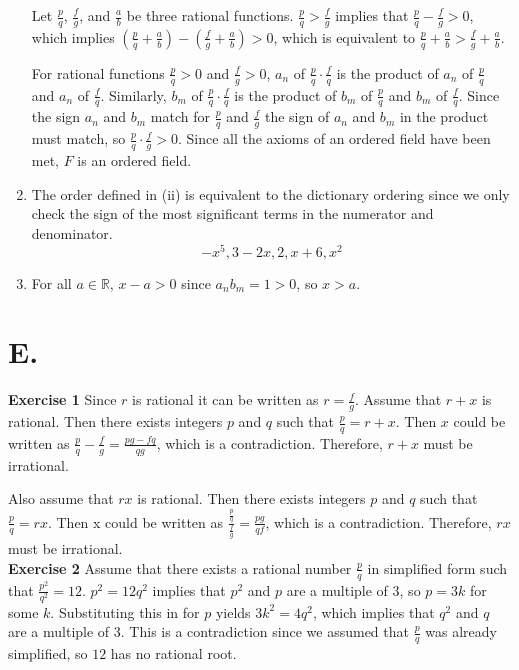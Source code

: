 \documentclass{article}
\begin{document}
\begin{enumerate}
    Let $\frac{p}{q}$, $\frac{f}{g}$, and $\frac{a}{b}$ be three rational functions.
    $\frac{p}{q} > \frac{f}{g}$ implies that $\frac{p}{q} - \frac{f}{g} > 0$, which implies
    $(\frac{p}{q} + \frac{a}{b}) - (\frac{f}{g} + \frac{a}{b}) > 0$, which is equivalent to
    $\frac{p}{q} + \frac{a}{b} > \frac{f}{g} + \frac{a}{b}$.

    For rational functions $\frac{p}{q} > 0$ and $\frac{f}{g} > 0$,
    $a_n$ of $\frac{p}{q}\cdot\frac{f}{q}$ is the product of $a_n$ of $\frac{p}{q}$
    and $a_n$ of $\frac{f}{q}$.
    Similarly, $b_m$ of $\frac{p}{q}\cdot\frac{f}{q}$ is the product of $b_m$ of $\frac{p}{q}$
    and $b_m$ of $\frac{f}{q}$.
    Since the sign $a_n$ and $b_m$ match for $\frac{p}{q}$ and $\frac{f}{g}$
    the sign of $a_n$ and $b_m$ in the product must match, 
    so $\frac{p}{q} \cdot \frac{f}{g} > 0$.
    Since all the axioms of an ordered field have been met, $F$ is an ordered field.
    \item The order defined in (ii) is equivalent to the dictionary ordering since 
    we only check the sign of the most significant terms in the numerator and denominator.
    \[
        -x^5, 3-2x, 2, x+6, x^2
    \]
    \item For all $a \in \mathbb{R}$, $x-a > 0$ since $a_nb_m = 1 > 0$, so $x > a$.
\end{enumerate}
\newpage

\section*{E.}
    \textbf{Exercise 1}
    Since $r$ is rational it can be written as $r = \frac{f}{g}$.
    Assume that $r+x$ is rational. 
    Then there exists integers $p$ and $q$ such that $\frac{p}{q} = r+x$.
    Then $x$ could be written as $\frac{p}{q} - \frac{f}{g} = \frac{pg-fq}{qg}$,
    which is a contradiction.
    Therefore, $r+x$ must be irrational.

    Also assume that $rx$ is rational.
    Then there exists integers $p$ and $q$ such that $\frac{p}{q} = rx$.
    Then x could be written as $\frac{\frac{p}{q}}{\frac{f}{g}} = \frac{pg}{qf}$,
    which is a contradiction.
    Therefore, $rx$ must be irrational.\\

    \textbf{Exercise 2}
    Assume that there exists a rational number $\frac{p}{q}$ in simplified form
    such that $\frac{p^2}{q^2} = 12$.
    $p^2 = 12q^2$ implies that $p^2$ and $p$ are a multiple of 3,
    so $p=3k$ for some $k$.
    Substituting this in for $p$ yields $3k^2 = 4q^2$, which implies that $q^2$
    and $q$ are a multiple of 3.
    This is a contradiction since we assumed that 
    $\frac{p}{q}$ was already simplified, so $12$ has no rational root.\\
\end{document}
